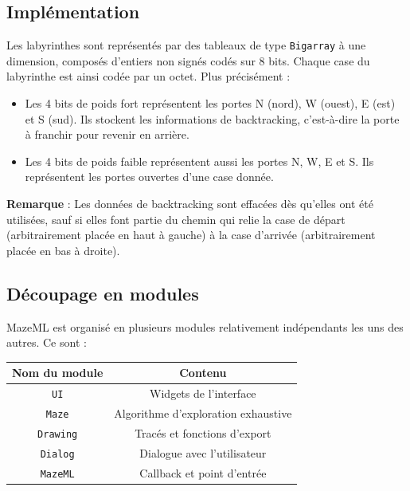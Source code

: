 \documentclass[11pt]{article}
\begin{document}
    \subsection{Implémentation}

    Les labyrinthes sont représentés par des tableaux de type \texttt{Bigarray} 
  à une dimension, composés d'entiers non signés codés sur 8 bits. Chaque case 
  du labyrinthe est ainsi codée par un octet. Plus précisément :

  \vspace{3mm}
  \begin{itemize}
    \item Les 4 bits de poids fort représentent les portes N (nord), W (ouest), 
    E (est) et S (sud). Ils stockent les informations de backtracking, 
    c'est-à-dire la porte à franchir pour revenir en arrière.
    \item Les 4 bits de poids faible représentent aussi les portes N, W, E et S.
    Ils représentent les portes ouvertes d'une case donnée.
  \end{itemize}
  \vspace{3mm}

  \textbf{Remarque} : Les données de backtracking sont effacées dès qu'elles ont
  été utilisées, sauf si elles font partie du chemin qui relie la case de départ
  (arbitrairement placée en haut à gauche) à la case d'arrivée (arbitrairement
  placée en bas à droite).

    \subsection{Découpage en modules}

    MazeML est organisé en plusieurs modules relativement indépendants les uns 
  des autres. Ce sont :

  \begin{table}[!ht]
    \centering
    \begin{tabular}{cc}
      \textbf{Nom du module} & \textbf{Contenu}                       \\\hline
      \texttt{UI}            & Widgets de l'interface                 \\
      \texttt{Maze}          & Algorithme d'exploration exhaustive    \\
      \texttt{Drawing}       & Tracés et fonctions d'export           \\
      \texttt{Dialog}        & Dialogue avec l'utilisateur            \\
      \texttt{MazeML}        & Callback et point d'entrée
    \end{tabular}
  \end{table}
\end{document}
